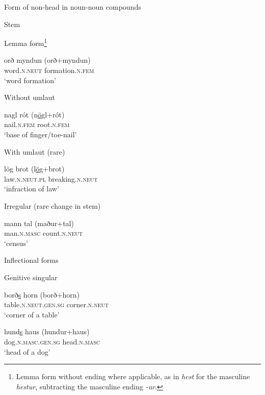 \documentclass[output=paper]{LSP/langsci}
\begin{document}
\ea
\label{extab:bjarnadottir:2}
Form of non-head in noun-noun compounds\\
\begin{xlist}
 Stem
\begin{xlist}
 Lemma form\footnote{Lemma form without  ending where applicable, as in \textit{hest} for the masculine \textit{hestur}, subtracting the masculine  ending \textit{-ur}.} 
\begin{xlist}
	\gll orð myndun (orð+myndun) \\
	 word\textsc{.n.neut} formation\textsc{.n.fem}\\
	\glt ‘word formation’
\end{xlist}
 Without umlaut 
\begin{xlist}
	\gll nagl rót (n\underline{ö}gl+rót) \\
	 nail\textsc{.n.fem} root\textsc{.n.fem}\\
	\glt ‘base of finger/toe-nail’ 
\end{xlist}\largerpage[1]
 With umlaut (rare) 
\begin{xlist}
	\gll lög brot (l\underline{ö}g+brot) \\
     law\textsc{.n.neut.pl} breaking\textsc{.n.neut}\\
	\glt ‘infraction of law’
\end{xlist}
 Irregular (rare change in stem)
\begin{xlist}
	\gll mann tal (maður+tal) \\
	  man\textsc{.n.masc} count\textsc{.n.neut}\\
	\glt ‘census’
\end{xlist}
\end{xlist}
 Inflectional forms
\begin{xlist}
 Genitive singular 
\begin{xlist}
	\gll borð\underline{s} horn (borð+horn) \\
	 table\textsc{.n.neut.gen.sg} corner\textsc{.n.neut}\\
	\glt ‘corner of a table’

	\gll hund\underline{s} haus (hundur+haus) \\
	 dog\textsc{.n.masc.gen.sg} head\textsc{.n.masc}\\
	\glt ‘head of a dog’


\end{xlist}
\end{xlist}
\end{xlist}
\end{document}
